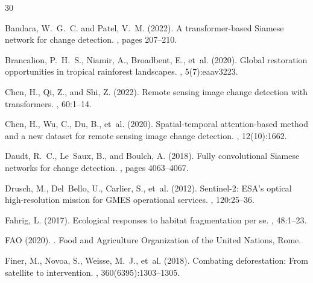 \documentclass[11pt,a4paper]{article}
\begin{document}
\begin{thebibliography}{30}

Bandara, W.~G.~C. and Patel, V.~M. (2022).
\newblock A transformer-based Siamese network for change detection.
, pages 207--210.

Brancalion, P.~H.~S., Niamir, A., Broadbent, E., et~al. (2020).
\newblock Global restoration opportunities in tropical rainforest landscapes.
, 5(7):eaav3223.

Chen, H., Qi, Z., and Shi, Z. (2022).
\newblock Remote sensing image change detection with transformers.
, 60:1--14.

Chen, H., Wu, C., Du, B., et~al. (2020).
\newblock Spatial-temporal attention-based method and a new dataset for remote sensing image change detection.
, 12(10):1662.

Daudt, R.~C., Le~Saux, B., and Boulch, A. (2018).
\newblock Fully convolutional Siamese networks for change detection.
, pages 4063--4067.

Drusch, M., Del~Bello, U., Carlier, S., et~al. (2012).
\newblock Sentinel-2: ESA's optical high-resolution mission for GMES operational services.
, 120:25--36.

Fahrig, L. (2017).
\newblock Ecological responses to habitat fragmentation per se.
, 48:1--23.

FAO (2020).
.
\newblock Food and Agriculture Organization of the United Nations, Rome.

Finer, M., Novoa, S., Weisse, M.~J., et~al. (2018).
\newblock Combating deforestation: From satellite to intervention.
, 360(6395):1303--1305.


\end{thebibliography}
\end{document}
